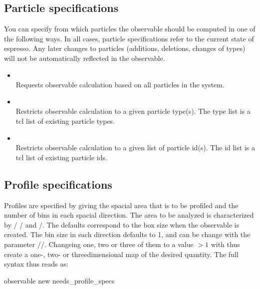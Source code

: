 \subsection{Particle specifications}
\label{sec:PartSpec}
You can specify from which particles the observable should be computed in one of 
the following ways. In all cases, particle specifications refer to the current
state of espresso. Any later changes to particles (additions, deletions, changes
of types) will not be automatically reflected in the observable.
  \begin{itemize}
    \item {} \\
          Requests observable calculation based on all particles in the system.
    \item {}  \\
          Restricts observable calculation to a given particle type(s). The type
	  list is a tcl list of existing particle types.
    \item {}  \\
          Restricts observable calculation to a given list of particle id(s). The id 
	  list is a tcl list of existing particle ids.
  \end{itemize}

\subsection{Profile specifications}
\label{sec:DensProfSpec}
Profiles are specified by giving the spacial area that is to be profiled and
the number of bins in each spacial direction. The area to be analyzed is characterized
by / / and /. The defaults
correspond to the box size when the observable is created.
The bin size in each direction defaults to 1, and can be change with the parameter 
//. Changeing one, two or three of them to 
a value $>1$ with thus create a one-, two- or threedimensional map of the desired quantity.
The full syntax thus reads as:
\begin{essyntax}
    observable new needs\_profile\_specs  
\end{essyntax}

